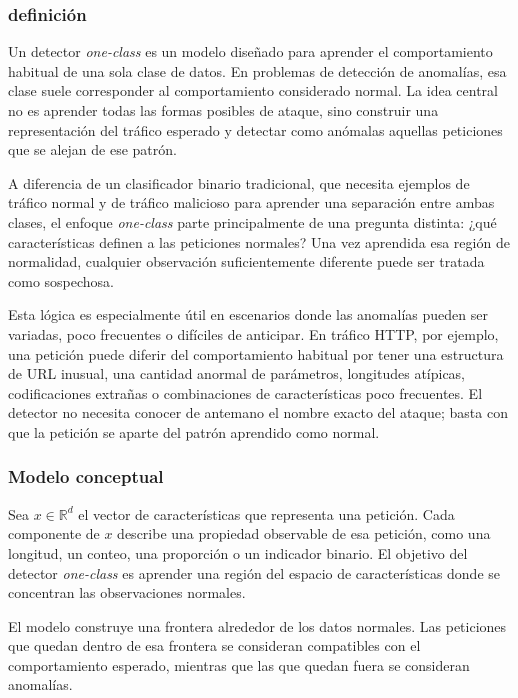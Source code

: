 \documentclass[12pt,oneside]{report}
\newcommand{\R}{\mathbb{R}}
\begin{document}
\subsubsection{definición}

Un detector \textit{one-class} es un modelo diseñado para aprender el comportamiento habitual de una sola clase de datos. En problemas de detección de anomalías, esa clase suele corresponder al comportamiento considerado normal. La idea central no es aprender todas las formas posibles de ataque, sino construir una representación del tráfico esperado y detectar como anómalas aquellas peticiones que se alejan de ese patrón.

A diferencia de un clasificador binario tradicional, que necesita ejemplos de tráfico normal y de tráfico malicioso para aprender una separación entre ambas clases, el enfoque \textit{one-class} parte principalmente de una pregunta distinta: ¿qué características definen a las peticiones normales? Una vez aprendida esa región de normalidad, cualquier observación suficientemente diferente puede ser tratada como sospechosa.

Esta lógica es especialmente útil en escenarios donde las anomalías pueden ser variadas, poco frecuentes o difíciles de anticipar. En tráfico HTTP, por ejemplo, una petición puede diferir del comportamiento habitual por tener una estructura de URL inusual, una cantidad anormal de parámetros, longitudes atípicas, codificaciones extrañas o combinaciones de características poco frecuentes. El detector no necesita conocer de antemano el nombre exacto del ataque; basta con que la petición se aparte del patrón aprendido como normal.

\subsubsection{Modelo conceptual}

Sea $x \in \R^d$ el vector de características que representa una petición. Cada componente de $x$ describe una propiedad observable de esa petición, como una longitud, un conteo, una proporción o un indicador binario. El objetivo del detector \textit{one-class} es aprender una región del espacio de características donde se concentran las observaciones normales.

El modelo construye una frontera alrededor de los datos normales. Las peticiones que quedan dentro de esa frontera se consideran compatibles con el comportamiento esperado, mientras que las que quedan fuera se consideran anomalías.
\end{document}
